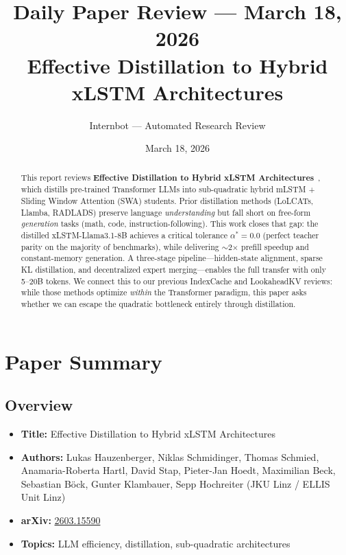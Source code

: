 \documentclass[11pt]{article}
\title{Daily Paper Review --- March 18, 2026\\
\large Effective Distillation to Hybrid xLSTM Architectures}
\author{Internbot --- Automated Research Review}
\date{March 18, 2026}
\begin{document}
\maketitle

\begin{abstract}
This report reviews \textbf{Effective Distillation to Hybrid xLSTM Architectures}~\cite{xlstm-distill}, which distills pre-trained Transformer LLMs into sub-quadratic hybrid mLSTM + Sliding Window Attention (SWA) students.
Prior distillation methods (LoLCATs, Llamba, RADLADS) preserve language \emph{understanding} but fall short on free-form \emph{generation} tasks (math, code, instruction-following).
This work closes that gap: the distilled xLSTM-Llama3.1-8B achieves a critical tolerance $\alpha^* = 0.0$ (perfect teacher parity on the majority of benchmarks), while delivering $\sim$2$\times$ prefill speedup and constant-memory generation.
A three-stage pipeline---hidden-state alignment, sparse KL distillation, and decentralized expert merging---enables the full transfer with only 5--20B tokens.
We connect this to our previous IndexCache and LookaheadKV reviews: while those methods optimize \emph{within} the Transformer paradigm, this paper asks whether we can escape the quadratic bottleneck entirely through distillation.
\end{abstract}

\section{Paper Summary}

\subsection{Overview}
\begin{itemize}
    \item \textbf{Title:} Effective Distillation to Hybrid xLSTM Architectures
    \item \textbf{Authors:} Lukas Hauzenberger, Niklas Schmidinger, Thomas Schmied, Anamaria-Roberta Hartl, David Stap, Pieter-Jan Hoedt, Maximilian Beck, Sebastian B\"{o}ck, Gunter Klambauer, Sepp Hochreiter (JKU Linz / ELLIS Unit Linz)
    \item \textbf{arXiv:} \href{https://arxiv.org/abs/2603.15590}{2603.15590}
    \item \textbf{Topics:} LLM efficiency, distillation, sub-quadratic architectures
\end{itemize}
\end{document}

